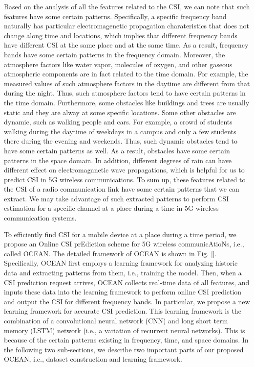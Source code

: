 \documentclass[10pt,journal,cspaper,compsoc]{IEEEtran}
\begin{document}
Based on the analysis of all the features related to the CSI, we can note that such features have some certain patterns. Specifically, a specific frequency band naturally has particular electromagenetic propagation charateristics that does not change along time and locations, which implies that different frequency bands have different CSI at the same place and at the same time. As a result, frequency bands have some certain patterns in the frequency domain. Moreover, the atmosphere factors like water vapor, molecules of oxygen, and other gaseous atmospheric components are in fact related to the time domain. For example, the measured values of such atmosphere factors in the daytime are different from that during the night. Thus, such atmosphere factors tend to have certain patterns in the time domain. Furthermore, some obstacles like buildings and trees are usually static and they are alway at some specific locations. Some other obstacles are dynamic, such as walking people and cars. For example, a crowd of students walking during the daytime of weekdays in a campus and only a few students there during the evening and weekends. Thus, such dynamic obstacles tend to have some certain patterns as well. As a result, obstacles have some certain patterns in the space domain. In addition, different degrees of rain can have different effect on electromaganetic wave propagations, which is helpful for us to predict CSI in 5G wireless communications. To sum up, these features related to the CSI of a radio communication link have some certain patterns that we can extract. We may take advantage of such extracted patterns to perform CSI estimation for a specific channel at a place during a time in 5G wireless communication systems.

To efficiently find CSI for a mobile device at a place during a time period, we propose an Online CSI prEdiction scheme for 5G wireless communicAtioNs, i.e., called OCEAN. The detailed framework of OCEAN is shown in Fig. \ref{}. Specifically, OCEAN first employs a learning framework for analyzing historic data and extracting patterns from them, i.e., training the model. Then, when a CSI prediction request arrives, OCEAN collects real-time data of all features, and inputs these data into the learning framework to perform online CSI prediction and output the CSI for different frequency bands. In particular, we propose a new learning framework for accurate CSI prediction. This learning framework is the combination of a convolutional neural network (CNN) and long short term memory (LSTM) network (i.e., a variation of recurrent neural networks). This is because of the certain patterns existing in frequency, time, and space domains. In the following two sub-sections, we describe two important parts of our proposed OCEAN, i.e., dataset construction and learning framework.
\end{document}
